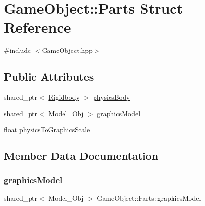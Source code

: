 \hypertarget{struct_game_object_1_1_parts}{}\section{Game\+Object\+:\+:Parts Struct Reference}
\label{struct_game_object_1_1_parts}


{\ttfamily \#include $<$Game\+Object.\+hpp$>$}

\subsection*{Public Attributes}
\begin{DoxyCompactItemize}
\item 
shared\+\_\+ptr$<$ \mbox{\hyperlink{class_rigidbody}{Rigidbody}} $>$ \mbox{\hyperlink{struct_game_object_1_1_parts_ac118274639b83227dbce5cd23008660a}{physics\+Body}}
\item 
shared\+\_\+ptr$<$ Model\+\_\+\+Obj $>$ \mbox{\hyperlink{struct_game_object_1_1_parts_a620574a4a1e9cec0d1a11dc70206e636}{graphics\+Model}}
\item 
float \mbox{\hyperlink{struct_game_object_1_1_parts_a898129420b23efe2ed98f1e63a21c1e9}{physics\+To\+Graphics\+Scale}}
\end{DoxyCompactItemize}


\subsection{Member Data Documentation}
\mbox{\label{struct_game_object_1_1_parts_a620574a4a1e9cec0d1a11dc70206e636}} 
\subsubsection{\texorpdfstring{graphics\+Model}{graphicsModel}}
{\footnotesize\ttfamily shared\+\_\+ptr$<$ Model\+\_\+\+Obj $>$ Game\+Object\+::\+Parts\+::graphics\+Model}

\mbox{\label{struct_game_object_1_1_parts_ac118274639b83227dbce5cd23008660a}} 
